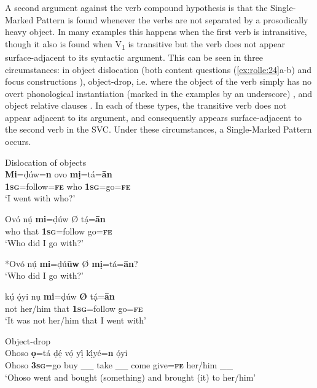 \documentclass[output=paper]{langsci/langscibook}
\begin{document}
A second argument against the verb compound hypothesis is that the Single-Marked Pattern is found whenever the verbs are not separated by a prosodically heavy object. In many examples this happens when the first verb is intransitive, though it also is found when V\textsubscript{1} is transitive but the verb does not appear surface-adjacent to its syntactic argument. This can be seen in three circumstances: in object dislocation  (both content questions (\ref{ex:rolle:24}a-b) and focus constructions ), object-drop, i.e. where the object of the verb simply has no overt phonological instantiation (marked in the examples by an underscore) , and object relative clauses . In each of these types, the transitive verb does not appear adjacent to its argument, and consequently appears surface-adjacent to the second verb in the SVC. Under these circumstances, a Single-Marked Pattern occurs.

\ea
{Dislocation of objects}\\
\gll   \textbf{Mi}=ḍúw=\textbf{n}     ovo     \textbf{mị}=tá=\textbf{ān}\\
      \textbf{1}\textbf{\textsc{sg}}=follow=\textbf{\textsc{fe}}   who   \textbf{1}\textbf{\textsc{sg}}=go=\textbf{\textsc{fe}}\\
\glt ‘I went with who?’
\z

\ea
\gll   Ovó   nụ́   \textbf{mi}=ḍúw    Ø  tạ́=\textbf{ān}\\
      who   that   \textbf{1}\textbf{\textsc{sg}}=follow     go=\textbf{\textsc{fe}}\\
\glt ‘Who did I go with?’
\z

\ea
    *Ovó nụ́ \textbf{mi}=ḍú\textbf{ūw} Ø \textbf{mị}=tá=\textbf{ān}?\\
\glt ‘Who did I go with?’
\z

\ea
\gll   kụ́   ọ́yi     nụ     \textbf{mi}=ḍúw   \textbf{Ø}  tạ́=\textbf{ān}\\
       not   her/him   that     \textbf{\textsc{1sg}}=follow     go=\textbf{\textsc{fe}}\\
\glt ‘It was not her/him that I went with’ 
\z

\ea
{Object-drop}\\
\gll  Ohoso   \textbf{ọ}=tá   ḍẹ́     vọ́     yị́    kị́yé=\textbf{n}   ọ́yi\\
     Ohoso   \textbf{3}\textbf{\textsc{sg}}=go   buy   \_\_  take \_\_  come   give=\textbf{\textsc{fe}}  her/him  \_\_\\
\glt ‘Ohoso went and bought (something) and brought (it) to her/him’ \citep[121]{Kari2004}
\z
\end{document}
